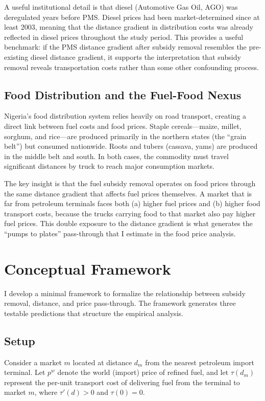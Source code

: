 \documentclass[12pt]{article}
\begin{document}
A useful institutional detail is that diesel (Automotive Gas Oil, AGO) was deregulated years before PMS. Diesel prices had been market-determined since at least 2003, meaning that the distance gradient in distribution costs was already reflected in diesel prices throughout the study period. This provides a useful benchmark: if the PMS distance gradient after subsidy removal resembles the pre-existing diesel distance gradient, it supports the interpretation that subsidy removal reveals transportation costs rather than some other confounding process.

\subsection{Food Distribution and the Fuel-Food Nexus}

Nigeria's food distribution system relies heavily on road transport, creating a direct link between fuel costs and food prices. Staple cereals---maize, millet, sorghum, and rice---are produced primarily in the northern states (the ``grain belt'') but consumed nationwide. Roots and tubers (cassava, yams) are produced in the middle belt and south. In both cases, the commodity must travel significant distances by truck to reach major consumption markets.

The key insight is that the fuel subsidy removal operates on food prices through the same distance gradient that affects fuel prices themselves. A market that is far from petroleum terminals faces both (a) higher fuel prices and (b) higher food transport costs, because the trucks carrying food to that market also pay higher fuel prices. This double exposure to the distance gradient is what generates the ``pumps to plates'' pass-through that I estimate in the food price analysis.


\section{Conceptual Framework}
\label{sec:framework}

I develop a minimal framework to formalize the relationship between subsidy removal, distance, and price pass-through. The framework generates three testable predictions that structure the empirical analysis.

\subsection{Setup}

Consider a market $m$ located at distance $d_m$ from the nearest petroleum import terminal. Let $p^w$ denote the world (import) price of refined fuel, and let $\tau(d_m)$ represent the per-unit transport cost of delivering fuel from the terminal to market $m$, where $\tau'(d) > 0$ and $\tau(0) = 0$.
\end{document}
